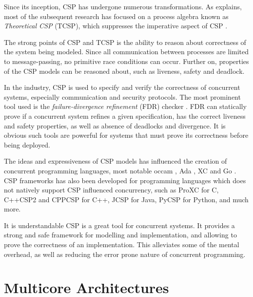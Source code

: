 Since its inception, CSP has undergone numerous transformations. As \citet{abdallah2005communicating} explains, most of the subsequent research has focused on a process algebra known as \textit{Theoretical CSP} (TCSP), which suppresses the imperative aspect of CSP \citep{brookes1984theory}. 

The strong points of CSP and TCSP is the ability to reason about correctness of the system being modeled. Since all communication between processes are limited to message\hyp{}passing, no primitive race conditions can occur. Further on, properties of the CSP models can be reasoned about, such as liveness, safety and deadlock. 

In the industry, CSP is used to specify and verify the correctness of concurrent systems, especially communication and security protocols. The most prominent tool used is the \textit{failure\hyp{}divergence refinement} (FDR) checker \citep{manual2000failures}. FDR can statically prove if a concurrent system refines a given specification, has the correct liveness and safety properties, as well as absence of deadlocks and divergence. It is obvious such tools are powerful for systems that must prove its correctness before being deployed.

The ideas and expressiveness of CSP models has influenced the creation of concurrent programming languages, most notable occam \citep{inmos1988occam}, Ada \citep{ledgard1983reference}, XC \citep{douglas2009programming} and Go \citep{go2009go}. CSP frameworks has also been developed for programming languages which does not natively support CSP influenced concurrency, such as ProXC \citep{pettersen2016proxc} for C, C++CSP2 \citep{brown2007c++csp2} and CPPCSP \citep{chalmers2016cppcsp} for C++, JCSP \citep{welch2007jcsp} for Java, PyCSP \citep{bjorndalen2007pycsp} for Python, and much more.

It is understandable CSP is a great tool for concurrent systems. It provides a strong and safe framework for modelling and implementation, and allowing to prove the correctness of an implementation. This alleviates some of the mental overhead, as well as reducing the error prone nature of concurrent programming. 


\section{Multicore Architectures}
\label{sec:multicore_architectures}

